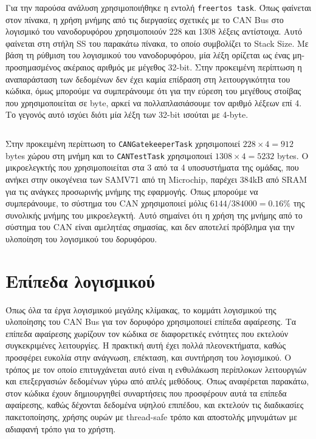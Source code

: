 \documentclass[a4paper,nobib,justified]{tufte-book}
\begin{document}
Για την παρούσα ανάλυση χρησιμοποιήθηκε η εντολή \texttt{freertos task}. Όπως φαίνεται στον πίνακα, η χρήση μνήμης από τις διεργασίες σχετικές με το CAN Bus στο λογισμικό του νανοδορυφόρου χρησιμοποιούν 228 και 1308 λέξεις αντίστοιχα. Αυτό φαίνεται στη στήλη SS του παρακάτω πίνακα, το οποίο συμβολίζει το Stack Size. Με βάση τη ρύθμιση του λογισμικού του νανοδορυφόρου, μία λέξη ορίζεται ως ένας μη-προσημασμένος ακέραιος αριθμός με μέγεθος 32-bit. Στην προκειμένη περίπτωση η αναπαράσταση των δεδομένων δεν έχει καμία επίδραση στη λειτουργικότητα του κώδικα, όμως μπορούμε να συμπεράνουμε ότι για την εύρεση του μεγέθους στοίβας που χρησιμοποιείται σε byte, αρκεί να πολλαπλασιάσουμε τον αριθμό λέξεων επί 4. Το γεγονός αυτό ισχύει διότι μία λέξη των 32-bit ισούται με 4-byte.
\inputminted[breaklines=false,linenos=false]{c++}{code/examples/can-memory-usage.cpp}

Στην προκειμένη περίπτωση το \texttt{CANGatekeeperTask} χρησιμοποιεί $ 228 \times 4 = 912 $ bytes χώρου στη μνήμη και το \texttt{CANTestTask} χρησιμοποιεί $ 1308 \times 4 = 5232 $ bytes. Ο μικροελεγκτής που χρησιμοποιείται στα 3 από τα 4 υποσυστήματα της ομάδας, που ανήκει στην οικογένεια των SAMV71 από τη Microchip, παρέχει 384kB από SRAM για τις ανάγκες προσωρινής μνήμης της εφαρμογής. Όπως μπορούμε να συμπεράνουμε, το σύστημα του CAN χρησιμοποιεί μόλις $ 6144 / 384000 = 0.16\% $ της συνολικής μνήμης του μικροελεγκτή. Αυτό σημαίνει ότι η χρήση της μνήμης από το σύστημα του CAN είναι αμελητέας σημασίας, και δεν αποτελεί πρόβλημα για την υλοποίηση του λογισμικού του δορυφόρου.

\section{Επίπεδα λογισμικού}
Όπως όλα τα έργα λογισμικού μεγάλης κλίμακας, το κομμάτι λογισμικού της υλοποίησης του CAN Bus για τον δορυφόρο χρησιμοποιεί επίπεδα αφαίρεσης. Τα επίπεδα αφαίρεσης χωρίζουν τον κώδικα σε διαφορετικές ενότητες που εκτελούν συγκεκριμένες λειτουργίες. Η πρακτική αυτή έχει πολλά πλεονεκτήματα, καθώς προσφέρει ευκολία στην ανάγνωση, επέκταση, και συντήρηση του λογισμικού. Ο τρόπος με τον οποίο επιτυγχάνεται αυτό είναι η ενθυλάκωση περίπλοκων λειτουργιών και επεξεργασιών δεδομένων γύρω από απλές μεθόδους. Όπως αναφέρεται παρακάτω, στον κώδικα έχουν δημιουργηθεί συναρτήσεις που προσφέρουν αυτά τα επίπεδα αφαίρεσης, καθώς δέχονται δεδομένα υψηλού επιπέδου, και εκτελούν τις διαδικασίες πακετοποίησης, χρήσης ουρών με thread-safe τρόπο και αποστολής μηνυμάτων με αδιαφανή τρόπο για το χρήστη.
\end{document}
